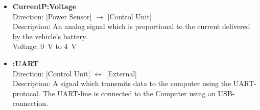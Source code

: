 \begin{itemize}
	Direction: [Power Sensor] $\rightarrow$ [Control Unit]\\
	Description: The voltage-drop over the vehicle's battery.\\
	Voltage: \SI{0}{\volt} to \SI{5}{\volt}
	\item \textbf{CurrentP:Voltage}\\
	Direction: [Power Sensor] $\rightarrow$ [Control Unit]\\
	Description: An analog signal which is proportional to the current delivered by the vehicle's battery.\\
	Voltage: \SI{0}{\volt} to \SI{4}{\volt}
	\item \textbf{:UART}\\
	Direction: [Control Unit] $\leftrightarrow$ [External]\\
	Description: A signal which transmits data to the computer using the UART-protocol. The UART-line is connected to the Computer using an USB-connection.
\end{itemize}